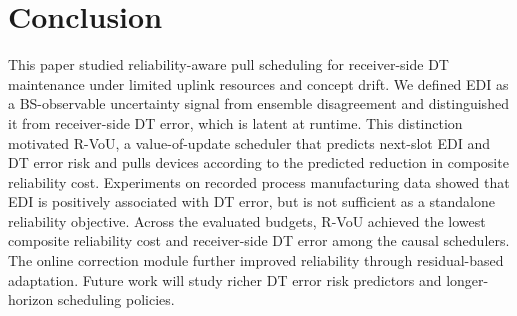 \documentclass[conference]{IEEEtran}
\begin{document}
\section{Conclusion}

This paper studied reliability-aware pull scheduling for receiver-side DT
maintenance under limited uplink resources and concept drift. We defined EDI
as a BS-observable uncertainty signal from ensemble disagreement and
distinguished it from receiver-side DT error, which is latent at runtime. This
distinction motivated R-VoU, a value-of-update scheduler that predicts
next-slot EDI and DT error risk and pulls devices according to the predicted
reduction in composite reliability cost. Experiments on recorded process
manufacturing data showed that EDI is positively associated with DT error,
but is not sufficient as a standalone reliability objective. Across the
evaluated budgets, R-VoU achieved the lowest composite reliability cost and
receiver-side DT error among the causal schedulers. The online correction
module further improved reliability through residual-based adaptation. Future
work will study richer DT error risk predictors and longer-horizon scheduling
policies.
\vspace{-2.950mm}


\end{document}
